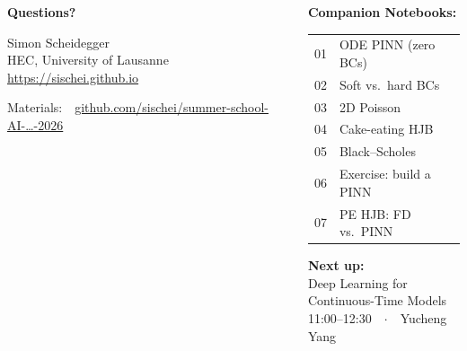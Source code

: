 \documentclass[aspectratio=169,11pt]{beamer}
\begin{document}
\begin{frame}{}
\begin{columns}[c]
\begin{center}
{\Huge \textcolor{uzhblue}{\textbf{Questions?}}}

\vspace{1.0cm}
{\large Simon Scheidegger}\\[4pt]
{\small HEC, University of Lausanne}\\[4pt]
\url{https://sischei.github.io}

\vspace{0.6cm}
{\small Materials:~~\href{https://github.com/sischei/summer-school-AI-for-economics-and-finance-2026}{github.com/sischei/summer-school-AI-\ldots-2026}}
\end{center}

\begin{center}
\textbf{Companion Notebooks:}\\[8pt]
{\small
\begin{tabular}{rl}
01 & ODE PINN (zero BCs) \\
02 & Soft vs.\ hard BCs \\
03 & 2D Poisson \\
04 & Cake-eating HJB \\
05 & Black--Scholes \\
06 & Exercise: build a PINN \\
07 & PE HJB: FD vs.\ PINN \\
\end{tabular}
}

\vspace{0.7cm}
\textbf{Next up:}\\[6pt]
{\large Deep Learning for}\\
{\large Continuous-Time Models}\\[6pt]
{\small 11:00--12:30~~$\cdot$~~Yucheng Yang}
\end{center}
\end{columns}
\end{frame}
\end{document}
